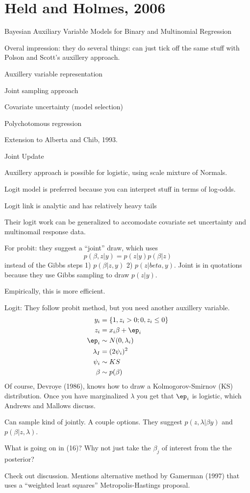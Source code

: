 \documentclass{article}
\begin{document}
\section{Held and Holmes, 2006}

Bayesian Auxiliary Variable Models for Binary and Multinomial Regression

\begin{outline}

\1 Overal impression: they do several things: can just tick off the same stuff
with Polson and Scott's auxillery approach.

  \2 Auxillery variable representation

  \2 Joint sampling approach

  \2 Covariate uncertainty (model selection)

  \2 Polychotomous regression

\1 Extension to Alberta and Chib, 1993.

  \2 Joint Update

  \2 Auxillery approach is possible for logistic, using scale mixture of
  Normals.

    \3 Logit model is preferred because you can interpret stuff in terms of
    log-odds.

    \3 Logit link is analytic and has relatively heavy tails

  \2 Their logit work can be generalized to accomodate covariate set uncertainty
  and multinomail response data.

\1 For probit: they suggest a ``joint'' draw, which uses
\[
p(\beta, z |y) = p(z |y) p(\beta | z)
\]
instead of the Gibbs steps 1) $p(\beta | z, y)$ 2) $p(z | beta, y)$.  Joint is
in quotations because they use Gibbs sampling to draw $p(z|y)$.

  \2 Empirically, this is more efficient.

\1 Logit: They follow probit method, but you need another auxillery variable.
\begin{align*}
y_i & = \{ 1, z_i > 0; 0, z_i \leq 0 \} \\
z_i & = x_i \beta + \ep_i \\
\ep_i & \sim N(0, \lambda_i) \\
\lambda_I & = (2 \psi_i)^2 \\
\psi_i & \sim KS \\
\beta & \sim p(\beta)
\end{align*}
Of course, Devroye (1986), knows how to draw a Kolmogorov-Smirnov (KS)
distribution.  Once you have marginalized $\lambda$ you get that
$\ep_i$ is logistic, which Andrews and Mallows discuss.

  \2 Can sample kind of jointly.  A couple options.  They suggest $p(z, \lambda
  | \beta y)$ and $p(\beta | z, \lambda)$.

\1 What is going on in (16)?  Why not just take the $\beta_j$ of interest from
the the posterior?

\1 Check out discussion.  Mentions alternative method by Gamerman (1997) that
uses a ``weighted least squares'' Metropolis-Hastings proposal.

\end{outline}
\end{document}
